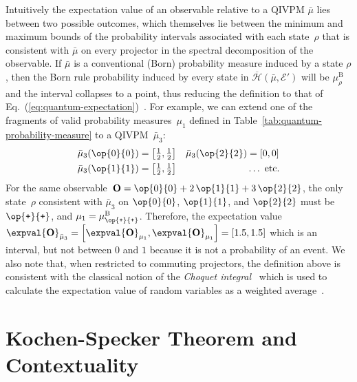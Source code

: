 \documentclass[english,reprint, aps, prl,superscriptaddress, showpacs,
showkeys, longbibliography, amsmath, amssymb, floatfix]{revtex4-1}
\theoremstyle{plain}
\theoremstyle{definition}
\newcommand{\Hilb}{\mathcal{H}}
\newcommand{\events}{\ensuremath{\mathcal{E}}}
\newcommand{\proj}[1]{\op{#1}{#1}}
\newcommand{\ps}{\texttt{+}}
\newcommand{\coreBorn}{\ensuremath{\overline{\Hilb}}}
\begin{document}
\noindent Intuitively the expectation value of an observable relative
to a QIVPM $\bar{\mu}$ lies between two possible outcomes, which
themselves lie between the minimum and maximum bounds of the probability
intervals associated with each state~$\rho$ that is consistent with
$\bar{\mu}$ on every projector in the spectral decomposition of the
observable. If $\bar{\mu}$ is a conventional (Born) probability measure
induced by a state $\rho$, then the Born rule probability induced
by every state in $\coreBorn\left(\bar{\mu},\events'\right)$ will
be $\mu_{\rho}^{\mathrm{B}}$ and the interval collapses to a point,
thus reducing the definition to that of Eq.~(\ref{eq:quantum-expectation})~\citep{HOSTunpublished}.
For example, we can extend one of the fragments of valid probability
measures~$\mu_{1}$ defined in Table~\ref{tab:quantum-probability-measure}
to a QIVPM~$\bar{\mu}_{3}$:
\begin{equation}
\begin{aligned}\bar{\mu}_{3}(\proj{0}) & =\left[\tfrac{1}{2},\tfrac{1}{2}\right] & \bar{\mu}_{3}(\proj{2}) & =\left[0,0\right]\\
\bar{\mu}_{3}(\proj{1}) & =\left[\tfrac{1}{2},\tfrac{1}{2}\right] &  & \ldots\textrm{ etc.}
\end{aligned}
\label{eq:Born-QIVPM}
\end{equation}
For the same observable~$\mathbf{O}=\proj{0}+2\,\proj{1}+3\,\proj{2}$,
the only state~$\rho$ consistent with $\bar{\mu}_{3}$ on $\proj{0}$,
$\proj{1}$, and $\proj{2}$ must be $\proj{\ps}$, and $\mu_{1}=\mu_{\proj{\ps}}^{\mathrm{B}}$.
Therefore, the expectation value~$\expval{\mathbf{O}}_{\bar{\mu}_{3}}=\left[\expval{\mathbf{O}}_{\mu_{1}},\expval{\mathbf{O}}_{\mu_{1}}\right]=\left[1.5,1.5\right]$
which is an interval, but not between $0$ and $1$ because it is
not a probability of an event. We also note that, when restricted
to commuting projectors, the definition above is consistent with the
classical notion of the \emph{Choquet integral}~\citep{GilboaSchmeidler1994,Grabisch2016}
which is used to calculate the expectation value of random variables
as a weighted average~\citep{HOSTunpublished}.

\section{Kochen-Specker Theorem and Contextuality}
\label{sec:Kochen-Specker}
  
\end{document}
